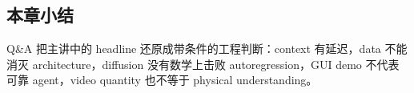 
\subsection{本章小结}

Q\&A 把主讲中的 headline 还原成带条件的工程判断：context 有延迟，data 不能消灭 architecture，diffusion 没有数学上击败 autoregression，GUI demo 不代表可靠 agent，video quantity 也不等于 physical understanding。

